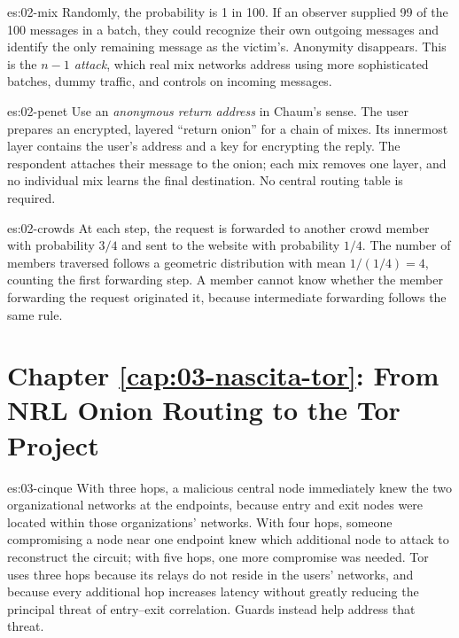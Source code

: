 \begin{soluzione}{es:02-mix}
Randomly, the probability is 1 in 100. If an observer supplied 99 of the 100 messages in a batch, they could recognize their own outgoing messages and identify the only remaining message as the victim's. Anonymity disappears. This is the \emph{$n-1$ attack}, which real mix networks address using more sophisticated batches, dummy traffic, and controls on incoming messages.
\end{soluzione}

\begin{soluzione}{es:02-penet}
Use an \emph{anonymous return address} in Chaum's sense. The user prepares an encrypted, layered \enquote{return onion} for a chain of mixes. Its innermost layer contains the user's address and a key for encrypting the reply. The respondent attaches their message to the onion; each mix removes one layer, and no individual mix learns the final destination. No central routing table is required.
\end{soluzione}

\begin{soluzione}{es:02-crowds}
At each step, the request is forwarded to another crowd member with probability $3/4$ and sent to the website with probability $1/4$. The number of members traversed follows a geometric distribution with mean $1/(1/4) = 4$, counting the first forwarding step. A member cannot know whether the member forwarding the request originated it, because intermediate forwarding follows the same rule.
\end{soluzione}

\section*{Chapter \ref{cap:03-nascita-tor}: From NRL Onion Routing to the Tor Project}

\begin{soluzione}{es:03-cinque}
With three hops, a malicious central node immediately knew the two organizational networks at the endpoints, because entry and exit nodes were located within those organizations' networks. With four hops, someone compromising a node near one endpoint knew which additional node to attack to reconstruct the circuit; with five hops, one more compromise was needed. Tor uses three hops because its relays do not reside in the users' networks, and because every additional hop increases latency without greatly reducing the principal threat of entry--exit correlation. Guards instead help address that threat.
\end{soluzione}

